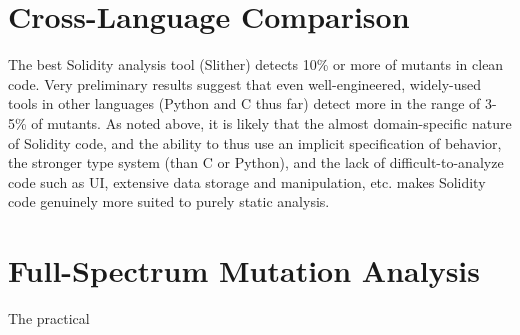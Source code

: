 \documentclass{article}
\begin{document}
\section{Cross-Language Comparison}

The best Solidity analysis tool (Slither) detects 10\% or more of mutants in clean code.   Very preliminary results suggest that even well-engineered, widely-used tools in other languages (Python and C thus far) detect more in the range of 3-5\% of mutants.  As noted above, it is likely that the almost domain-specific nature of Solidity code, and the ability to thus use an implicit specification of behavior, the stronger type system (than C or Python), and the lack of difficult-to-analyze code such as UI, extensive data storage and manipulation, etc. makes Solidity code genuinely more suited to purely static analysis. 

\section{Full-Spectrum Mutation Analysis}

The practical 



\end{document}
